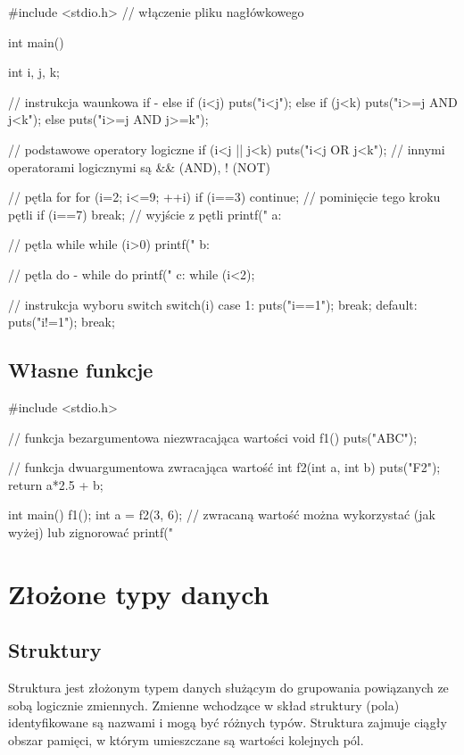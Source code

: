 \begin{CodeFrame*}[c]{}
#include <stdio.h> // włączenie pliku nagłówkowego

int main() {
    int i, j, k;
    
    // instrukcja waunkowa if - else
    if (i<j) {
        puts("i<j");
    } else if (j<k) {
        puts("i>=j AND j<k");
    } else {
        puts("i>=j AND j>=k");
    }
    
    // podstawowe operatory logiczne
    if (i<j || j<k)
        puts("i<j OR j<k");
    // innymi operatorami logicznymi są && (AND), ! (NOT)
    
    // pętla for
    for (i=2; i<=9; ++i) {
        if (i==3)
            continue; // pominięcie tego kroku pętli
        if (i==7)
            break; // wyjście z pętli
        printf(" a: %
    }
    
    // pętla while
    while (i>0) {
        printf(" b: %
    }
    
    // pętla do - while
    do {
        printf(" c: %
    } while (i<2);
    
    // instrukcja wyboru switch
    switch(i) {
        case 1:
            puts("i==1");
            break;
        default:
            puts("i!=1");
            break;
    }
}
\end{CodeFrame*}

\subsection{Własne funkcje}

\begin{CodeFrame*}[c]{}
#include <stdio.h>

// funkcja bezargumentowa niezwracająca wartości
void f1() {
    puts("ABC");
}

// funkcja dwuargumentowa zwracająca wartość
int f2(int a, int b) {
    puts("F2");
    return a*2.5 + b;
}

int main() {
    f1();
    int a = f2(3, 6);
    // zwracaną wartość można wykorzystać (jak wyżej) lub zignorować
    printf("%
}
\end{CodeFrame*}

\section{Złożone typy danych}

\subsection{Struktury}
Struktura jest złożonym typem danych służącym do grupowania powiązanych ze sobą logicznie zmiennych. Zmienne wchodzące w skład struktury (pola) identyfikowane są nazwami i mogą być różnych typów. Struktura zajmuje ciągły obszar pamięci, w którym umieszczane są wartości kolejnych pól. 

